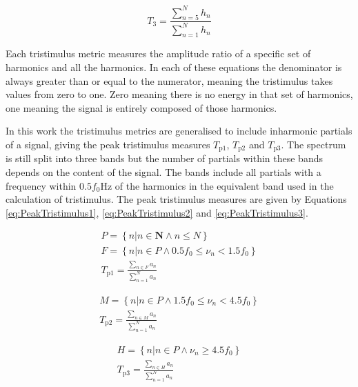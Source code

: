 			\begin{equation}
				T_{3} = \frac{\sum_{n = 5}^{N} h_{n}}{\sum_{n = 1}^{N} h_{n}}
				\label{eq:Tristimulus3}
			\end{equation}

			Each tristimulus metric measures the amplitude ratio of a specific set of harmonics and all the
			harmonics. In each of these equations the denominator is always greater than or equal to the
			numerator, meaning the tristimulus takes values from zero to one. Zero meaning there is no energy
			in that set of harmonics, one meaning the signal is entirely composed of those harmonics.

			In this work the tristimulus metrics are generalised to include inharmonic partials of a signal,
			giving the peak tristimulus measures $T_{\textrm{p}1}$, $T_{\textrm{p}2}$ and $T_{\textrm{p}3}$.
			The spectrum is still split into three bands but the number of partials within these bands depends
			on the content of the signal. The bands include all partials with a frequency within $0.5f_{0}$Hz
			of the harmonics in the equivalent band used in the calculation of tristimulus. The peak
			tristimulus measures are given by Equations \ref{eq:PeakTristimulus1}, \ref{eq:PeakTristimulus2}
			and \ref{eq:PeakTristimulus3}.

			\begin{gather}
				P = \left\{ n | n \in \textbf{N} \land n \leq N \right\} \nonumber \\
				F = \left\{ n | n \in P \land 0.5f_{0} \leq \nu_{n} < 1.5f_{0} \right\} \nonumber \\
				T_{\textrm{p}1} = \frac{\sum_{n \in F} a_{n}}{\sum_{n = 1}^{N} a_{n}}
				\label{eq:PeakTristimulus1}
			\end{gather}

			\begin{gather}
				M = \left\{ n | n \in P \land 1.5f_{0} \leq \nu_{n} < 4.5f_{0} \right\} \nonumber \\
				T_{\textrm{p}2} = \frac{\sum_{n \in M} a_{n}}{\sum_{n = 1}^{N} a_{n}}
				\label{eq:PeakTristimulus2}
			\end{gather}

			\begin{gather}
				H = \left\{ n | n \in P \land \nu_{n} \geq 4.5f_{0} \right\} \nonumber \\
				T_{\textrm{p}3} = \frac{\sum_{n \in H} a_{n}}{\sum_{n = 1}^{N} a_{n}}
				\label{eq:PeakTristimulus3}
			\end{gather}

